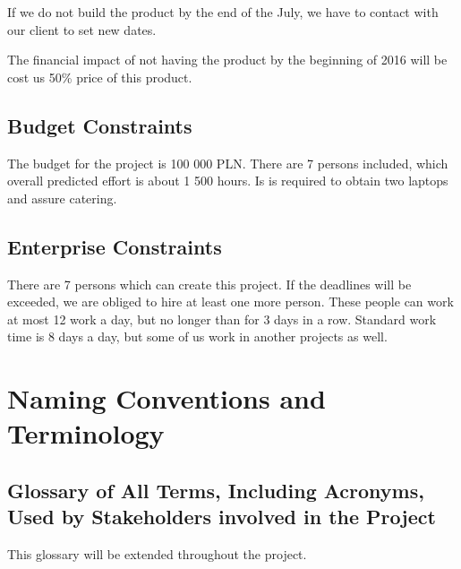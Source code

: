 \documentclass[a4paper,11pt,onecolumn,oneside]{book}
\begin{document}
If we do not build the product by the end of the July, we have to contact with our client to set new dates.  

The financial impact of not having the product by the beginning of 2016 will be cost us 50\% price of this product.

\subsection{Budget Constraints}

The budget for the project is 100 000 PLN. There are 7 persons included, which overall predicted effort is about 1 500 hours. Is is required to obtain two laptops and assure catering.

\subsection{Enterprise Constraints}

There are 7 persons which can create this project. If the deadlines will be exceeded, we are obliged to hire at least one more person. These people can work at most 12 work a day, but no longer than for 3 days in a row. Standard work time is 8 days a day, but some of us work in another projects as well.


\section{Naming Conventions and Terminology}
\subsection{Glossary of All Terms, Including Acronyms, Used by Stakeholders involved in the Project}
This glossary will be extended throughout the project.
\end{document}
